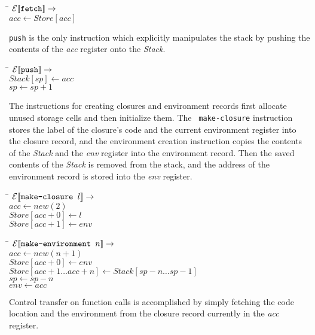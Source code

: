 \begin{tabbing}
\qquad \= \quad \kill
${\mathcal{E}{\normalfont [\![} \text{{\tt fetch}} {\normalfont ]\!]}} \rightarrow$\\
\>$acc \leftarrow Store[acc]$
\end{tabbing}
%
%
{\tt push} is the only instruction which explicitly manipulates the
stack by pushing the contents of the {\em acc} register onto the {\em
  Stack}.
%
\begin{tabbing}
\qquad \= \quad \kill
${\mathcal{E}{\normalfont [\![} \text{{\tt push}} {\normalfont ]\!]}} \rightarrow$\\
\>$Stack[sp] \leftarrow acc$\\
\>$sp \leftarrow sp+1$
\end{tabbing}
%
The instructions for creating closures and environment records first
allocate unused storage cells and then initialize them.  The {\tt
  make-closure} instruction stores the label of the closure's code and
the current environment register into the closure record, and the
environment creation instruction copies the contents of the {\em
  Stack} and the {\em env} register into the environment record.  Then
the saved contents of the {\em Stack} is removed from the stack, and
the address of the environment record is stored into the {\em env}
register.
%
\begin{tabbing}
\qquad \= \quad \kill
${\mathcal{E}{\normalfont [\![} \text{{\tt make-closure }} l {\normalfont ]\!]}} \rightarrow$\\
\>$acc \leftarrow new(2)$\\
\>$Store[acc+0] \leftarrow l$\\
\>$Store[acc+1] \leftarrow env$
\end{tabbing}
%
\begin{tabbing}
\qquad \= \quad \kill
${\mathcal{E}{\normalfont [\![} \text{{\tt make-environment }} n {\normalfont ]\!]}} \rightarrow$\\
\>$acc \leftarrow new(n+1)$\\
\>$Store[acc+0] \leftarrow env$\\
\>$Store[acc+1\dots acc+n] \leftarrow Stack[sp-n\dots sp-1]$\\
\>$sp \leftarrow sp - n$\\
\>$env \leftarrow acc$
\end{tabbing}
%
Control transfer on function calls is accomplished by simply fetching
the code location and the environment from the closure record
currently in the {\em acc} register.

